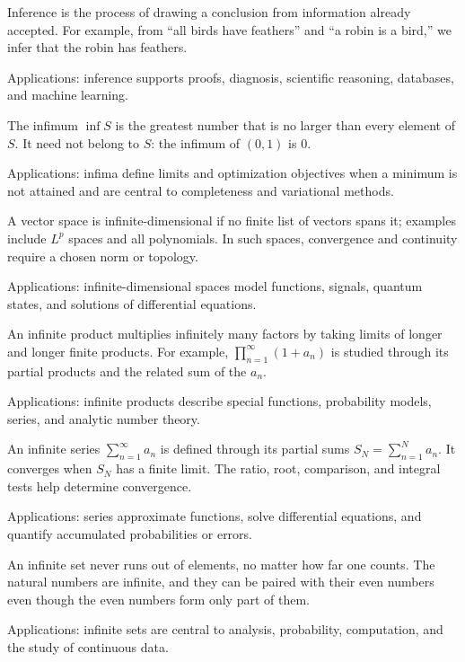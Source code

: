 Inference is the process of drawing a conclusion from information already accepted. For example, from “all birds have feathers” and “a robin is a bird,” we infer that the robin has feathers. \par\noindent Applications: inference supports proofs, diagnosis, scientific reasoning, databases, and machine learning.

The infimum $\inf S$ is the greatest number that is no larger than every element of $S$. It need not belong to $S$: the infimum of $(0,1)$ is $0$. \par\noindent Applications: infima define limits and optimization objectives when a minimum is not attained and are central to completeness and variational methods.

A vector space is infinite-dimensional if no finite list of vectors spans it; examples include $L^p$ spaces and all polynomials. In such spaces, convergence and continuity require a chosen norm or topology. \par\noindent Applications: infinite-dimensional spaces model functions, signals, quantum states, and solutions of differential equations.

An infinite product multiplies infinitely many factors by taking limits of longer and longer finite products. For example, $\prod_{n=1}^{\infty}(1+a_n)$ is studied through its partial products and the related sum of the $a_n$. \par\noindent Applications: infinite products describe special functions, probability models, series, and analytic number theory.

An infinite series $\sum_{n=1}^\infty a_n$ is defined through its partial sums $S_N=\sum_{n=1}^N a_n$. It converges when $S_N$ has a finite limit. The ratio, root, comparison, and integral tests help determine convergence. \par\noindent Applications: series approximate functions, solve differential equations, and quantify accumulated probabilities or errors.

An infinite set never runs out of elements, no matter how far one counts. The natural numbers are infinite, and they can be paired with their even numbers even though the even numbers form only part of them. \par\noindent Applications: infinite sets are central to analysis, probability, computation, and the study of continuous data.

